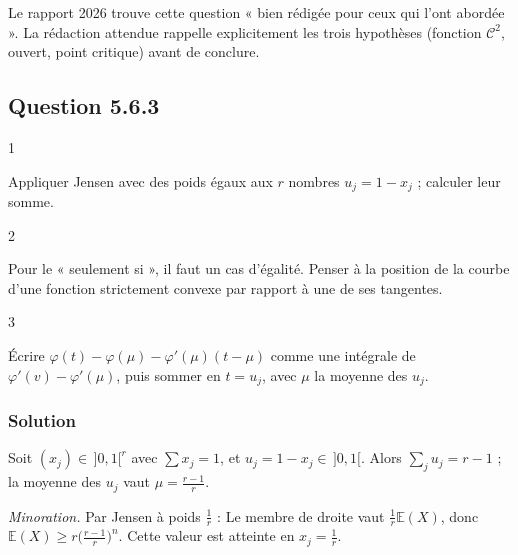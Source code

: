 \documentclass[11pt,a4paper]{article}
\newcommand{\equationajustee}[1]{%
  \sbox{\boiteequation}{$\displaystyle #1$}%
  \ifdim\wd\boiteequation>\linewidth
    \[\resizebox{\linewidth}{!}{\usebox{\boiteequation}}\]%
  \else
    \[#1\]%
  \fi}
\begin{document}
\begin{jury}

Le rapport 2026 trouve cette question « bien rédigée pour ceux qui l'ont abordée ». La rédaction attendue rappelle explicitement les trois hypothèses (fonction \(\mathcal C^2\), ouvert, point critique) avant de conclure.

\end{jury}

\hypertarget{question-5.6.3}{%
\subsection{Question 5.6.3}\label{question-5.6.3}}

\begin{indication}{1}

Appliquer Jensen avec des poids égaux aux \(r\) nombres \(u_j=1-x_j\) ; calculer leur somme.

\end{indication}

\begin{indication}{2}

Pour le « seulement si », il faut un cas d'égalité. Penser à la position de la courbe d'une fonction strictement convexe par rapport à une de ses tangentes.

\end{indication}

\begin{indication}{3}

Écrire \(\varphi(t)-\varphi(\mu)-\varphi'(\mu)(t-\mu)\) comme une intégrale de \(\varphi'(v)-\varphi'(\mu)\), puis sommer en \(t=u_j\), avec \(\mu\) la moyenne des \(u_j\).

\end{indication}

\hypertarget{solution-16}{%
\subsubsection{Solution}\label{solution-16}}

Soit \((x_j)\in\,]0,1[^r\) avec \(\sum x_j=1\), et \(u_j=1-x_j\in\,]0,1[\). Alors \(\sum_ju_j=r-1\) ; la moyenne des \(u_j\) vaut \(\mu=\frac{r-1}r\).

\emph{Minoration.} Par Jensen à poids \(\frac1r\) :
\equationajustee{\mu^n\le\frac1r\sum_ju_j^n.}
Le membre de droite vaut \(\frac1r\mathbb E(X)\), donc \(\mathbb E(X)\ge r\big(\frac{r-1}r\big)^n\). Cette valeur est atteinte en \(x_j=\frac1r\).
\end{document}
